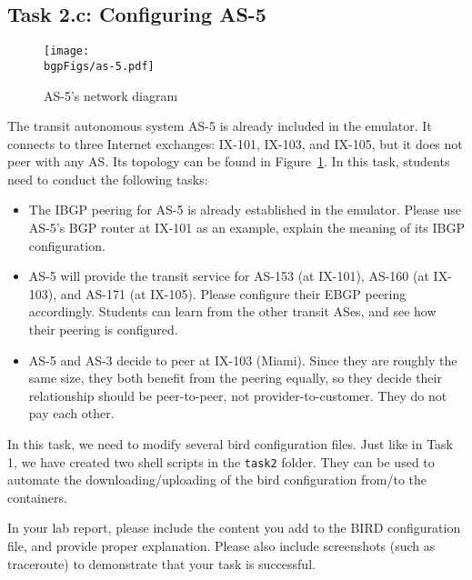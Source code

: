\subsection{Task 2.c: Configuring AS-5} 


\begin{figure}[htb]
  \begin{center}
    \texttt{[image: \\bgpFigs/as-5.pdf]}
  \end{center}
  \caption{AS-5's network diagram}
  \label{bgp:fig:as5}
\end{figure}

The transit autonomous system AS-5 is already included in the emulator. 
It connects to three 
Internet exchanges: IX-101, IX-103, and IX-105,
but it does not peer with any AS. Its topology can be found 
in Figure~\ref{bgp:fig:as5}.
In this task, students need to conduct the following tasks:

\begin{itemize}
  \item The IBGP peering for AS-5 is already established in the 
    emulator. Please use AS-5's BGP router at IX-101 as an example,
    explain the meaning of its IBGP configuration.

  \item AS-5 will provide the transit service for AS-153 (at IX-101), 
    AS-160 (at IX-103), and AS-171 (at IX-105). 
    Please configure their EBGP peering accordingly. Students can 
    learn from the other transit ASes, and see how their peering
    is configured. 


  \item AS-5 and AS-3 decide to peer at IX-103 (Miami). 
    Since they are roughly the same size, they both benefit from the 
    peering equally, so they decide 
    their relationship should be peer-to-peer, not provider-to-customer.
    They do not pay each other. 
\end{itemize}

In this task, we need to modify several bird configuration files.
Just like in Task 1, we have created two shell scripts in the 
\texttt{task2} folder. They can be used to automate the 
downloading/uploading of the bird configuration from/to the 
containers.


In your lab report, please include the content you add to the 
BIRD configuration file, and provide proper explanation.
Please also include screenshots (such as traceroute) to demonstrate 
that your task is successful. 



